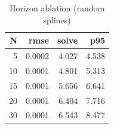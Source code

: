 \begin{table}
\caption{Horizon ablation (random splines)}
\label{tab:ablation_horizon}
\begin{tabular}{rrrr}
\toprule
N & rmse & solve & p95 \\
\midrule
5 & 0.0002 & 4.027 & 4.538 \\
10 & 0.0001 & 4.801 & 5.313 \\
15 & 0.0001 & 5.656 & 6.641 \\
20 & 0.0001 & 6.404 & 7.716 \\
30 & 0.0001 & 6.543 & 8.477 \\
\bottomrule
\end{tabular}
\end{table}
